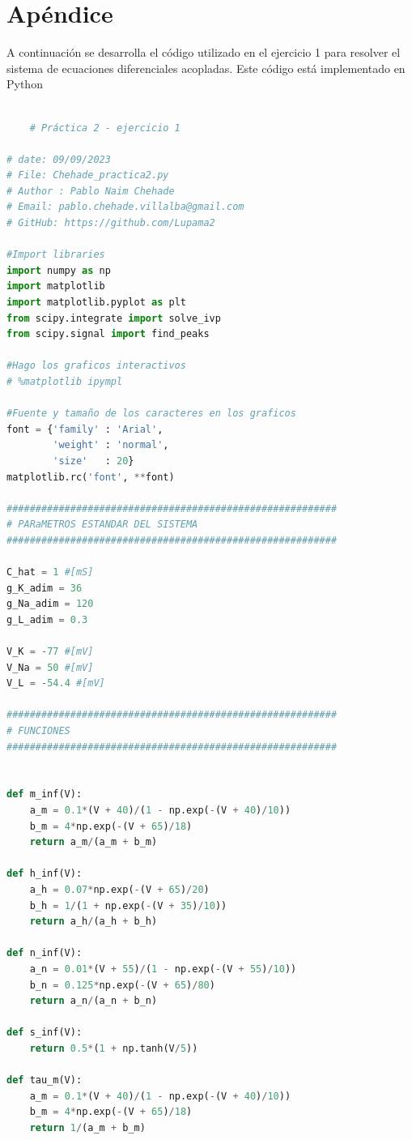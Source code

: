 \documentclass[aps,prb,twocolumn,superscriptaddress,floatfix,longbibliography]{revtex4-2}
\newcounter{para}
\begin{document}
\onecolumngrid

\section{Apéndice}

A continuación se desarrolla el código utilizado en el ejercicio 1 para resolver el sistema de ecuaciones diferenciales acopladas. Este código está implementado en Python

\begin{lstlisting}[language=Python]

    # Práctica 2 - ejercicio 1

# date: 09/09/2023
# File: Chehade_practica2.py
# Author : Pablo Naim Chehade
# Email: pablo.chehade.villalba@gmail.com
# GitHub: https://github.com/Lupama2

#Import libraries
import numpy as np
import matplotlib
import matplotlib.pyplot as plt
from scipy.integrate import solve_ivp
from scipy.signal import find_peaks

#Hago los graficos interactivos
# %matplotlib ipympl

#Fuente y tamaño de los caracteres en los graficos
font = {'family' : 'Arial',
        'weight' : 'normal',
        'size'   : 20}
matplotlib.rc('font', **font)

#########################################################
# PARaMETROS ESTANDAR DEL SISTEMA
#########################################################

C_hat = 1 #[mS]
g_K_adim = 36
g_Na_adim = 120
g_L_adim = 0.3

V_K = -77 #[mV]
V_Na = 50 #[mV]
V_L = -54.4 #[mV]

#########################################################
# FUNCIONES
#########################################################


def m_inf(V):
    a_m = 0.1*(V + 40)/(1 - np.exp(-(V + 40)/10))
    b_m = 4*np.exp(-(V + 65)/18)
    return a_m/(a_m + b_m)

def h_inf(V):
    a_h = 0.07*np.exp(-(V + 65)/20)
    b_h = 1/(1 + np.exp(-(V + 35)/10))
    return a_h/(a_h + b_h)

def n_inf(V):
    a_n = 0.01*(V + 55)/(1 - np.exp(-(V + 55)/10))
    b_n = 0.125*np.exp(-(V + 65)/80)
    return a_n/(a_n + b_n)

def s_inf(V):
    return 0.5*(1 + np.tanh(V/5))

def tau_m(V):
    a_m = 0.1*(V + 40)/(1 - np.exp(-(V + 40)/10))
    b_m = 4*np.exp(-(V + 65)/18)
    return 1/(a_m + b_m)


\end{lstlisting}
\end{document}
